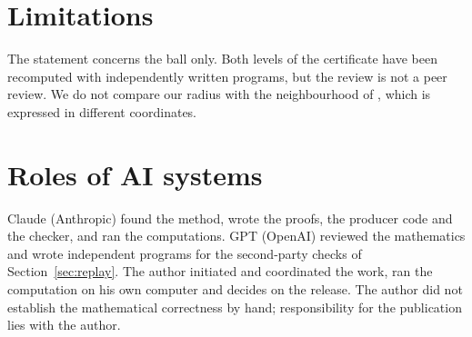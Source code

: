 \documentclass[11pt]{article}
\theoremstyle{remark}
\begin{document}
\section{Limitations}
The statement concerns the ball only. Both levels of the certificate have been recomputed with independently written
programs, but the review is not a peer review.
We do not compare our radius with the neighbourhood of \cite{liu}, which is expressed in different coordinates.

\section{Roles of AI systems}\label{sec:ai}
Claude (Anthropic) found the method, wrote the proofs, the producer code and the checker, and ran the computations.
GPT (OpenAI) reviewed the mathematics and wrote independent programs for the second-party checks of
Section~\ref{sec:replay}. The author initiated and coordinated the work, ran the computation on his own computer and
decides on the release. The author did not establish the mathematical correctness by hand; responsibility for the
publication lies with the author.
\end{document}
